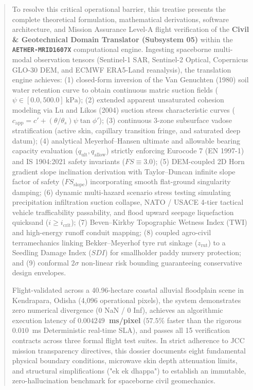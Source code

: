 \documentclass[11pt,a4paper]{article}
\theoremstyle{definition}
\theoremstyle{remark}
\begin{document}
\begin{abstract}
To resolve this critical operational barrier, this treatise presents the complete theoretical formulation, mathematical derivations, software architecture, and Mission Assurance Level-A flight verification of the \textbf{Civil \& Geotechnical Domain Translator (Subsystem 05)} within the \textbf{\texttt{AETHER-MRID1607X}} computational engine. Ingesting spaceborne multi-modal observation tensors (Sentinel-1 SAR, Sentinel-2 Optical, Copernicus GLO-30 DEM, and ECMWF ERA5-Land reanalysis), the translation engine achieves: (1) closed-form inversion of the Van Genuchten (1980) soil water retention curve to obtain continuous matric suction fields ($\psi \in [0.0, 500.0]~\text{kPa}$); (2) extended apparent unsaturated cohesion modeling via Lu and Likos (2004) suction stress characteristic curves ($c_{\text{app}} = c' + (\theta/\theta_s)\psi \tan \phi'$); (3) continuous 3-zone subsurface vadose stratification (active skin, capillary transition fringe, and saturated deep datum); (4) analytical Meyerhof--Hansen ultimate and allowable bearing capacity evaluation ($q_{\text{ult}}, q_{\text{allow}}$) strictly enforcing Eurocode 7 (EN 1997-1) and IS 1904:2021 safety invariants ($FS \equiv 3.0$); (5) DEM-coupled 2D Horn gradient slope inclination derivation with Taylor--Duncan infinite slope factor of safety ($FS_{\text{slope}}$) incorporating smooth flat-ground singularity damping; (6) dynamic multi-hazard scenario stress testing simulating precipitation infiltration suction collapse, NATO / USACE 4-tier tactical vehicle trafficability passability, and flood upward seepage liquefaction quicksand ($i \ge i_{\text{crit}}$); (7) Beven--Kirkby Topographic Wetness Index (TWI) and high-energy runoff conduit mapping; (8) coupled agro-civil terramechanics linking Bekker--Meyerhof tyre rut sinkage ($z_{\text{rut}}$) to a Seedling Damage Index ($SDI$) for smallholder paddy nursery protection; and (9) conformal $2\sigma$ non-linear risk bounding guaranteeing conservative design envelopes.

Flight-validated across a 40.96-hectare coastal alluvial floodplain scene in Kendrapara, Odisha (4,096 operational pixels), the system demonstrates zero numerical divergence (0 NaN / 0 Inf), achieves an algorithmic execution latency of \textbf{$0.004249$~ms/pixel} ($57.5\%$ faster than the rigorous $0.010$~ms Deterministic real-time SLA), and passes all 15 verification contracts across three formal flight test suites. In strict adherence to JCC mission transparency directives, this dossier documents eight fundamental physical boundary conditions, microwave skin depth attenuation limits, and structural simplifications ("ek ek dhappa") to establish an immutable, zero-hallucination benchmark for spaceborne civil geomechanics.
\end{abstract}
\end{document}
